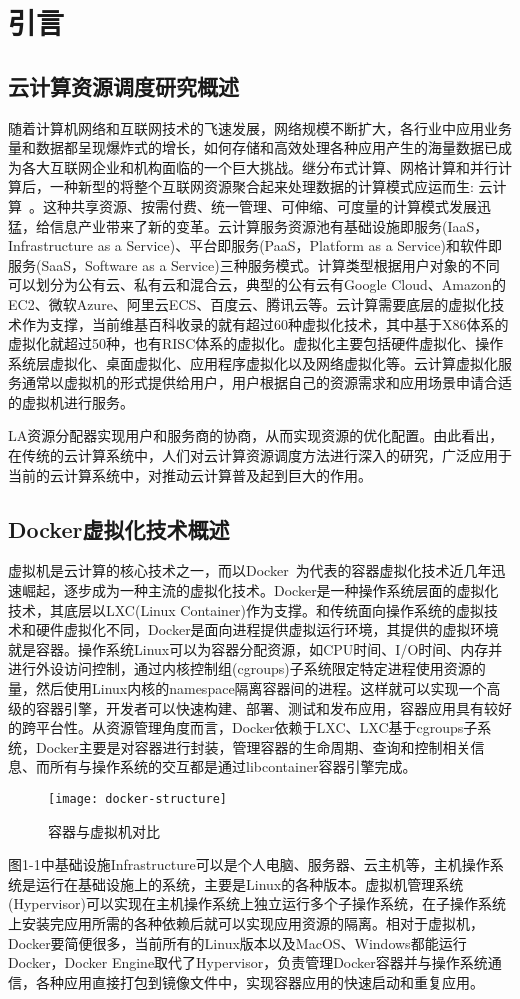 \chapter{引言}
\section{云计算资源调度研究概述}
随着计算机网络和互联网技术的飞速发展，网络规模不断扩大，各行业中应用业务量和数据都呈现爆炸式的增长，如何存储和高效处理各种应用产生的海量数据已成为各大互联网企业和机构面临的一个巨大挑战。继分布式计算、网格计算和并行计算后，一种新型的将整个互联网资源聚合起来处理数据的计算模式应运而生: 云计算~\cite{Hayes2008Cloud}。这种共享资源、按需付费、统一管理、可伸缩、可度量的计算模式发展迅猛，给信息产业带来了新的变革。云计算服务资源池有基础设施即服务(IaaS，Infrastructure as a Service)、平台即服务(PaaS，Platform as a Service)和软件即服务(SaaS，Software as a Service)三种服务模式。计算类型根据用户对象的不同可以划分为公有云、私有云和混合云，典型的公有云有Google Cloud、Amazon的EC2、微软Azure、阿里云ECS、百度云、腾讯云等。云计算需要底层的虚拟化技术作为支撑，当前维基百科收录的就有超过60种虚拟化技术，其中基于X86体系的虚拟化就超过50种，也有RISC体系的虚拟化。虚拟化主要包括硬件虚拟化、操作系统层虚拟化、桌面虚拟化、应用程序虚拟化以及网络虚拟化等。云计算虚拟化服务通常以虚拟机的形式提供给用户，用户根据自己的资源需求和应用场景申请合适的虚拟机进行服务。

LA资源分配器实现用户和服务商的协商，从而实现资源的优化配置。由此看出，在传统的云计算系统中，人们对云计算资源调度方法进行深入的研究，广泛应用于当前的云计算系统中，对推动云计算普及起到巨大的作用。

\section{Docker虚拟化技术概述}
虚拟机是云计算的核心技术之一，而以Docker~\cite{2015Docker}为代表的容器虚拟化技术近几年迅速崛起，逐步成为一种主流的虚拟化技术。Docker是一种操作系统层面的虚拟化技术，其底层以LXC(Linux Container)作为支撑。和传统面向操作系统的虚拟技术和硬件虚拟化不同，Docker是面向进程提供虚拟运行环境，其提供的虚拟环境就是容器。操作系统Linux可以为容器分配资源，如CPU时间、I/O时间、内存并进行外设访问控制，通过内核控制组(cgroups)子系统限定特定进程使用资源的量，然后使用Linux内核的namespace隔离容器间的进程。这样就可以实现一个高级的容器引擎，开发者可以快速构建、部署、测试和发布应用，容器应用具有较好的跨平台性。从资源管理角度而言，Docker依赖于LXC、LXC基于cgroups子系统，Docker主要是对容器进行封装，管理容器的生命周期、查询和控制相关信息、而所有与操作系统的交互都是通过libcontainer容器引擎完成。
\begin{figure}[H] %
	\centering
	\texttt{[image: docker-structure]}
	\caption{容器与虚拟机对比}
\end{figure}
图1-1中基础设施Infrastructure可以是个人电脑、服务器、云主机等，主机操作系统是运行在基础设施上的系统，主要是Linux的各种版本。虚拟机管理系统(Hypervisor)可以实现在主机操作系统上独立运行多个子操作系统，在子操作系统上安装完应用所需的各种依赖后就可以实现应用资源的隔离。相对于虚拟机，Docker要简便很多，当前所有的Linux版本以及MacOS、Windows都能运行Docker，Docker Engine取代了Hypervisor，负责管理Docker容器并与操作系统通信，各种应用直接打包到镜像文件中，实现容器应用的快速启动和重复应用。

